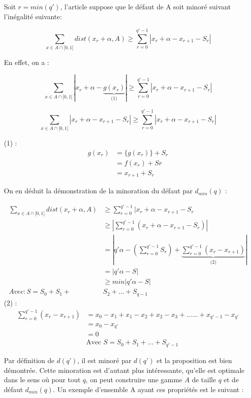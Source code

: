 \documentclass[moyen]{classeUPD}
\begin{document}
Soit $r = min (q')$, l'article \cite{caruso_application_nodate} suppose que le défaut de A soit minoré suivant l'inégalité suivante:

$$\sum_{x\in A \cap [0,1[}^{} dist(x_{r} + \alpha , A) \ge \sum_{r = 0}^{q' - 1} |x_{r} + \alpha - x_{r+1}- S_{r}|$$

En effet, on a :

$$	\sum_{x\in A \cap [0,1[}^{} |x_{r}+\alpha-\underbrace{g(x_{r})}_\text{(1)}| \ge \sum_{r = 0}^{q' - 1} |x_{r} + \alpha - x_{r+1}- S_{r}|$$

$$ \sum_{x\in A \cap [0,1[}^{} |x_{r}+\alpha-x_{r+1}- S_{r}| \ge \sum_{r = 0}^{q' - 1} |x_{r} + \alpha - x_{r+1}- S_{r}|$$


(1) : \begin{align*}
	g(x_{r}) &= \{g(x_{r})\}+S_{r}\\&=f(x_{r})+Sr\\&=x_{r+1}+S_{r}
\end{align*}

On en déduit la démonstration de la minoration du défaut par $d_{min}(q)$ :

\begin{align*}
	\sum_{x\in A \cap [0,1[}^{} dist(x_{r} + \alpha , A) &\ge \sum_{r = 0}^{q' - 1} |x_{r} + \alpha - x_{r+1}- S_{r}\\ &\ge  \left| \sum_{r = 0}^{q' - 1} (x_{r} + \alpha - x_{r+1}- S_{r})\right| \\& = \left|q'\alpha - \left(\sum_{r = 0}^{q'-1}S_{r}\right)+ \underbrace{\sum_{r = 0}^{q'-1}(x_{r}-x_{r+1})}_\text{(2)}\right| \\& = |q'\alpha-S|\\ &\ge min|q'\alpha-S|\\
	Avec: S = S_{0} + S_{1} +& S_{2} + ...+ S_{q-1}
\end{align*}
(2) : \begin{align*}
\sum_{r = 0}^{q'-1}(x_{r}-x_{r+1}) &= x_{0}-x_{1}+x_{1}-x_{2}+x_{2}-x_{3}+......+x_{q'-1}-x_{q'}\\&=x_{0}-x_{q'}\\&=0\\&\text{Avec } S = S_{0}+S_{1}+...+S_{q'-1}
\end{align*}

Par définition de $d(q’)$, il est minoré par $d(q’)$ et la proposition est bien démontrée. Cette minoration est d'autant plus intéressante, qu'elle est optimale dans le sens où pour tout $q$, on peut construire une gamme $A$ de taille $q$ et de défaut $d_{min}(q)$. Un exemple d'ensemble A ayant ces propriétés est le suivant :
\end{document}

